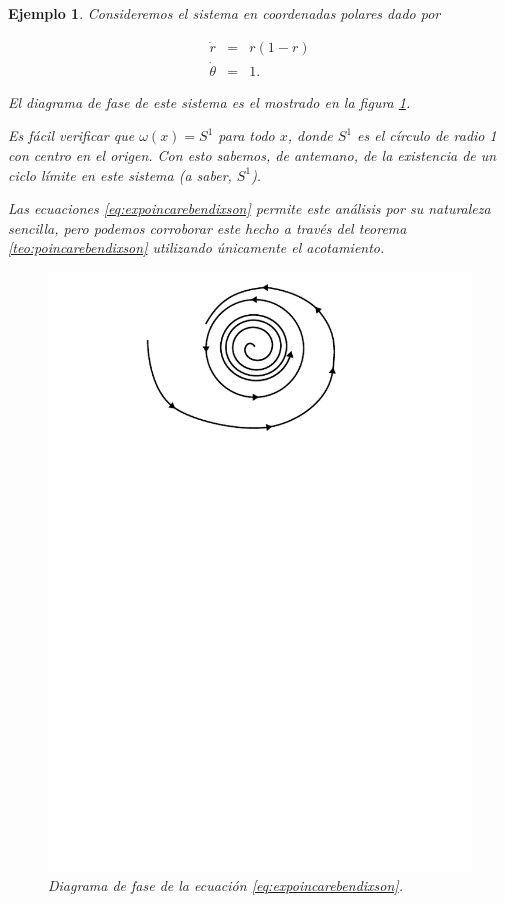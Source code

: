 \documentclass[11pt]{book}
\theoremstyle{definition}
\numberwithin{definition}{section}
\theoremstyle{theorem}
\numberwithin{theorem}{section}
\numberwithin{lemma}{section}
\numberwithin{corollary}{section}
\theoremstyle{plain}
\newtheorem{example}{Ejemplo}
\numberwithin{example}{section}
\begin{document}
\begin{example} \label{ex:poincarebendixson}
Consideremos el sistema en coordenadas polares dado por

\begin{equation} \label{eq:expoincarebendixson}
	\begin{array}{lll}
		\dot{r} & = & r(1-r) \\
		\dot{\theta} & = & 1.
	\end{array}
\end{equation}

El diagrama de fase de este sistema es el mostrado en la figura \ref{fig:expoincarebendixson}.

Es fácil verificar que $\omega(x) = S^1$ para todo $x$, donde $S^1$ es el círculo de radio 1 con centro en el origen. Con esto sabemos, de antemano, de la existencia de un ciclo límite en este sistema (a saber, $S^1$).

Las ecuaciones \ref{eq:expoincarebendixson} permite este análisis por su naturaleza sencilla, pero podemos corroborar este hecho a través del teorema \ref{teo:poincarebendixson} utilizando únicamente el acotamiento.

\begin{figure}[!htb] \label{fig:expoincarebendixson} \centering
	\includegraphics[scale=1.1]{figures/expoincarebendixson.pdf}
	\caption{Diagrama de fase de la ecuación \ref{eq:expoincarebendixson}.}
\end{figure}


\end{example}
\end{document}
